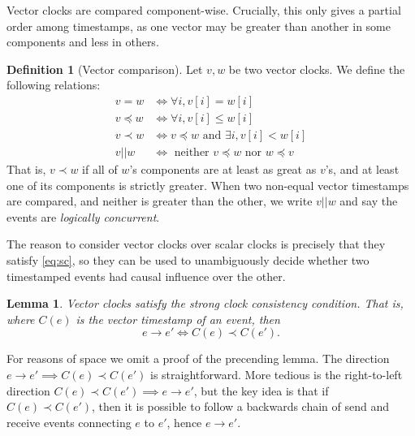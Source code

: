 \documentclass[]             %
{NASA}                       %
\newtheorem{lemma}[theorem]{Lemma}
\theoremstyle{definition}
\newtheorem{definition}{Definition}[section]
\begin{document}
Vector clocks are compared component-wise. Crucially, this only gives a partial
order among timestamps, as one vector may be greater than another in
some components and less in others.
\begin{definition}[Vector comparison]
  Let $v, w$ be two vector clocks. We define the following relations:
  \begin{align*}
             v = w &\iff \forall i, v[i] = w[i] \\
  v \preccurlyeq w &\iff \forall i, v[i] \leq w[i] \\
         v \prec w &\iff v \preccurlyeq w \textrm{ and } \exists i, v[i] < w[i] \\
            v || w &\iff \textrm{ neither } v \preccurlyeq w \textrm{ nor } w \preccurlyeq v
  \end{align*}
  That is, $v \prec w$ if all of $w$'s components are at least as
  great as $v$'s, and at least one of its components is strictly
  greater. When two non-equal vector timestamps are compared, and
  neither is greater than the other, we write $v || w$ and say the
  events are \emph{logically concurrent}.
\end{definition}

The reason to consider vector clocks over scalar clocks is precisely
that they satisfy \ref{eq:sc}, so they can be used to unambiguously
decide whether two timestamped events had causal influence over the
other.
\begin{lemma}
  Vector clocks satisfy the strong clock consistency condition. That
  is, where $C(e)$ is the vector timestamp of an event, then
  \[ e \to e' \iff C(e) \prec C(e'). \]
\end{lemma}

For reasons of space we omit a proof of the precending lemma.  The
direction $e \to e' \implies C(e) \prec C(e')$ is
straightforward. More tedious is the right-to-left direction
$C(e) \prec C(e') \implies e \to e'$, but the key idea is that if
$C(e) \prec C(e')$, then it is possible to follow a backwards chain of
send and receive events connecting $e$ to $e'$, hence $e \to e'$.


\end{document}
